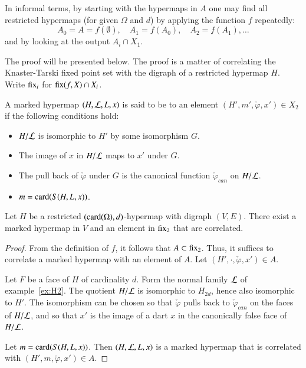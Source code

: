 In informal terms, by starting with the  hypermaps in $A$
one may find all restricted hypermaps (for given $\Omega$ and $d$) by
applying the function $f$ repeatedly:
\begin{displaymath}
A_0 = A = f(\emptyset),\quad A_1 = f(A_0),\quad A_2 = f(A_1),\ldots
\end{displaymath}
and by looking at the output $A_i \cap X_1$.
%

The proof will be presented below.  The proof is a matter of correlating the Knaster-Tarski fixed point set with the digraph of a restricted hypermap $H$.
Write ${\operatorname{fix}}_i$ for ${\operatorname{fix}}(f,X)\cap X_i$.


\begin{definition}[correlation]
  A marked hypermap $(H,{\cal L},L,x)$ is said to be
   to an element $(H',m',\check\varphi,x')\in X_2$ if
  the following conditions hold:
\begin{itemize}
\item $H/{\cal L}$ is isomorphic to $H'$ by some isomorphism $G$.
\item The image of $x$ in $H/{\cal L}$ maps to $x'$ under $G$.
\item The pull back of $\check\varphi$ under $G$ is the canonical function
$\check\varphi_{can}$ on $H/{\cal L}$.
\item $m = {\operatorname{card}}(S(H,L,x))$.
\end{itemize}
\end{definition}

\begin{lemma}\label{lemma:correlated-seed}
  Let $H$ be a restricted $({\operatorname{card}}(\Omega),d)$-hypermap with digraph
  $(V,E)$.  There exist a marked hypermap in
  $V$ and an element in ${\operatorname{fix}}_2$ that are
  correlated.
\end{lemma}

\begin{proof}  From the definition of $f$, it follows
that $A\subset {\operatorname{fix}}_2$.  Thus, it suffices to correlate a marked
hypermap with an element of $A$.  Let $(H',\cdot,\check\varphi,x')\in A$.

Let $F$ be a face of $H$ of cardinality $d$.  Form the normal family ${\cal L}$ of example~\ref{ex:H2}.  The quotient $H/{\cal L}$ is isomorphic to $H_{2d}$, hence also isomorphic to $H'$.  The isomorphism can be chosen so that
$\check\varphi$ pulls back to $\check\varphi_{can}$ on the faces of $H/{\cal L}$, and so that $x'$ is the image of a dart $x$ in the canonically false 
face of $H/{\cal L}$.  

Let $m = {\operatorname{card}}(S(H,L,x))$.  Then $(H,{\cal L},L,x)$ is a marked hypermap that
is correlated with $(H',m,\check\varphi,x')\in A$.
\end{proof}

